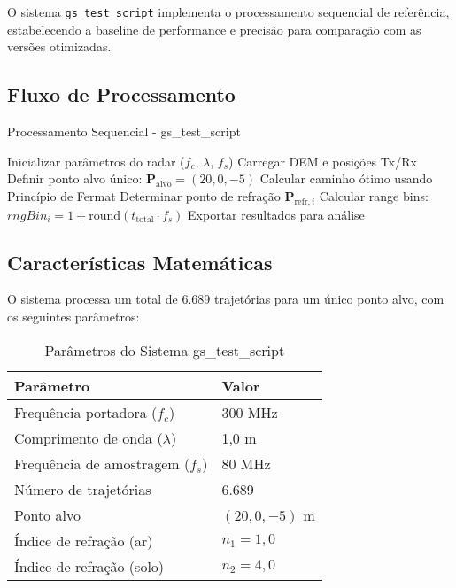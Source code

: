 \documentclass[12pt,a4paper]{article}
\begin{document}
O sistema \texttt{gs\_test\_script} implementa o processamento sequencial de referência, estabelecendo a baseline de performance e precisão para comparação com as versões otimizadas.

\subsection{Fluxo de Processamento}

\begin{algorithm}[H]
\caption{Processamento Sequencial - gs\_test\_script}
\begin{algorithmic}[1]
\STATE Inicializar parâmetros do radar ($f_c$, $\lambda$, $f_s$)
\STATE Carregar DEM e posições Tx/Rx
\STATE Definir ponto alvo único: $\mathbf{P}_{\text{alvo}} = (20, 0, -5)$
    \STATE Calcular caminho ótimo usando Princípio de Fermat
    \STATE Determinar ponto de refração $\mathbf{P}_{\text{refr},i}$
    \STATE Calcular range bins: $rngBin_i = 1 + \text{round}(t_{\text{total}} \cdot f_s)$
\ENDFOR
\STATE Exportar resultados para análise
\end{algorithmic}
\end{algorithm}

\subsection{Características Matemáticas}

O sistema processa um total de 6.689 trajetórias para um único ponto alvo, com os seguintes parâmetros:

\begin{table}[H]
\centering
\caption{Parâmetros do Sistema gs\_test\_script}
\begin{tabular}{@{}ll@{}}
\toprule
\textbf{Parâmetro} & \textbf{Valor} \\
\midrule
Frequência portadora ($f_c$) & 300 MHz \\
Comprimento de onda ($\lambda$) & 1,0 m \\
Frequência de amostragem ($f_s$) & 80 MHz \\
Número de trajetórias & 6.689 \\
Ponto alvo & $(20, 0, -5)$ m \\
Índice de refração (ar) & $n_1 = 1,0$ \\
Índice de refração (solo) & $n_2 = 4,0$ \\
\bottomrule
\end{tabular}
\end{table}
\end{document}
